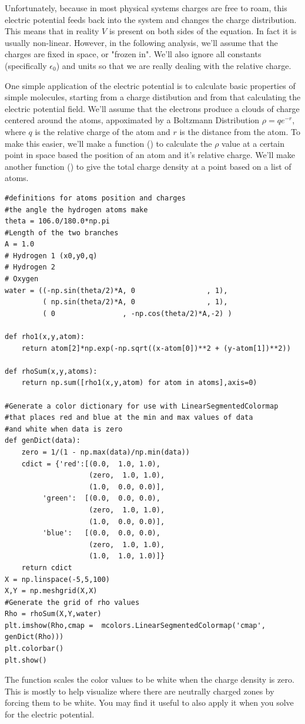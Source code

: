 Unfortunately, because in most physical systems charges are free to roam, this electric potential feeds back into the system and changes the charge distribution. 
This means that in reality $V$ is present on both sides of the equation.
In fact it is usually non-linear. 
However, in the following analysis, we'll assume that the charges are fixed in space, or "frozen in".
We'll also ignore all constants (specifically $\epsilon_0$) and units so that we are really dealing with the relative charge.

One simple application of the electric potential is to calculate basic properties of simple molecules, starting from a charge distibution and from that calculating the electric potential field.
We'll assume that the electrons produce a clouds of charge centered around the atoms, appoximated by a Boltzmann Distribution $\rho = q e^{-r}$, where $q$ is the relative charge of the atom and $r$ is the distance from the atom. 
To make this easier, we'll make a function () to calculate the $\rho$ value at a certain point in space based the position of an atom and it's relative charge. 
We'll make another function () to give the total charge density at a point based on a list of atoms.

\begin{lstlisting}
#definitions for atoms position and charges
#the angle the hydrogen atoms make
theta = 106.0/180.0*np.pi
#Length of the two branches
A = 1.0
# Hydrogen 1 (x0,y0,q)
# Hydrogen 2 
# Oxygen
water = ((-np.sin(theta/2)*A, 0					, 1),
         ( np.sin(theta/2)*A, 0				 	, 1),
         ( 0				, -np.cos(theta/2)*A,-2) )

def rho1(x,y,atom):
    return atom[2]*np.exp(-np.sqrt((x-atom[0])**2 + (y-atom[1])**2))

def rhoSum(x,y,atoms):
    return np.sum([rho1(x,y,atom) for atom in atoms],axis=0)

#Generate a color dictionary for use with LinearSegmentedColormap
#that places red and blue at the min and max values of data
#and white when data is zero
def genDict(data):
    zero = 1/(1 - np.max(data)/np.min(data))
    cdict = {'red':[(0.0,  1.0, 1.0),
                   	(zero,  1.0, 1.0),
                   	(1.0,  0.0, 0.0)],
         'green':  [(0.0,  0.0, 0.0),
                   	(zero,  1.0, 1.0),
                   	(1.0,  0.0, 0.0)],
         'blue':   [(0.0,  0.0, 0.0),
                   	(zero,  1.0, 1.0),
                   	(1.0,  1.0, 1.0)]}
    return cdict
X = np.linspace(-5,5,100)
X,Y = np.meshgrid(X,X)
#Generate the grid of rho values
Rho = rhoSum(X,Y,water)
plt.imshow(Rho,cmap =  mcolors.LinearSegmentedColormap('cmap', genDict(Rho)))
plt.colorbar()
plt.show()
\end{lstlisting}
The function  scales the color values to be white when the charge density is zero. This is mostly to help visualize where there are neutrally charged zones by forcing them to be white. You may find it useful to also apply it when you solve for the electric  potential.

